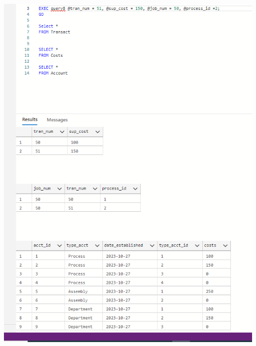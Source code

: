 \documentclass[11pt]{article}
\begin{document}
\begin{enumerate}
\includegraphics[width = \textwidth]{transact1.png}



\end{enumerate}
\end{document}
